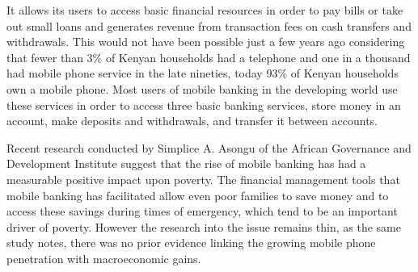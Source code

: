 \documentclass[12pt]{article}
\begin{document}
It allows its users to access basic financial resources in order to pay bills or take out small loans and generates revenue from transaction fees on cash transfers and withdrawals.\autocite{economist2013mobileBanking}
This would not have been possible just a few years ago considering that fewer than 3\% of Kenyan households had a telephone and one in a thousand had mobile phone service in the late nineties, today 93\% of Kenyan households own a mobile phone.\autocite[5]{asongu2015impact}
Most users of mobile banking in the developing world use these services in order to access three basic banking services, store money in an account, make deposits and withdrawals, and transfer it between accounts.\autocite[6]{asongu2015impact}

Recent research conducted by Simplice A. Asongu of the African Governance and Development Institute suggest that the rise of mobile banking has had a measurable positive impact upon poverty.\autocite[14]{asongu2015impact}
The financial management tools that mobile banking has facilitated allow even poor families to save money and to access these savings during times of emergency, which tend to be an important driver of poverty.\autocite[14]{asongu2015impact}
However the research into the issue remains thin, as the same study notes, there was no prior evidence linking the growing mobile phone penetration with macroeconomic gains.

\singlespacing
\nocite{*}
\printbibliography
\end{document}
